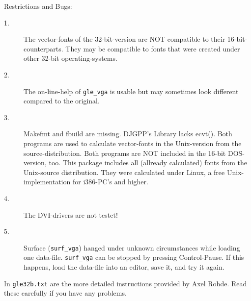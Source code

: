 Restrictions and Bugs:
\begin{description}		
\item[1.] The vector-fonts of the 32-bit-version are NOT compatible to their 
16-bit-counterparts. They may be compatible to fonts that were created 
under other 32-bit operating-systems.
\item[2.] The on-line-help of \verb#gle_vga# is usable but may sometimes look different 
compared to the original.
\item[3.] Makefmt and fbuild are missing. DJGPP's Library lacks ecvt(). 
Both programs are used to calculate vector-fonts in the Unix-version 
from the source-distribution. Both programs are NOT included in the 
16-bit DOS-version, too. This package includes all (allready calculated) 
fonts from the Unix-source distribution. They were calculated under Linux, 
a free Unix-implementation for i386-PC's and higher.
\item[4.] The DVI-drivers are not testet! 
\item[5.] Surface (\verb#surf_vga#) hanged under unknown circumstances while loading 
one data-file. \verb#surf_vga# can be stopped by pressing Control-Pause. 
If this happens, load the data-file into an editor, save it, and try it 
again.
\end{description}

In \verb#gle32b.txt# are the more detailed instructions provided by Axel Rohde.
Read these carefully if you have any problems.
